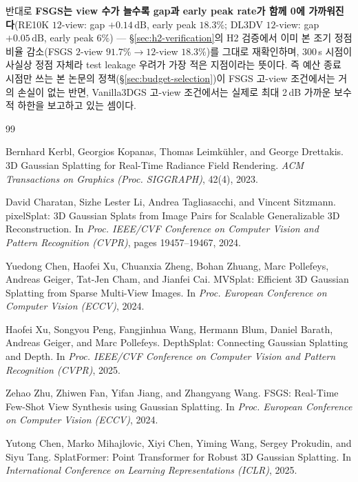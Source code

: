 반대로 \textbf{FSGS는 view 수가 늘수록 gap과 early peak rate가 함께 0에 가까워진다}(RE10K $12$-view: gap $+0.14\,\mathrm{dB}$, early peak $18.3\%$; DL3DV $12$-view: gap $+0.05\,\mathrm{dB}$, early peak $6\%$) — \S\ref{sec:h2-verification}의 H2 검증에서 이미 본 조기 정점 비율 감소(FSGS $2$-view $91.7\% \to 12$-view $18.3\%$)를 그대로 재확인하며, 300\,s 시점이 사실상 정점 자체라 test leakage 우려가 가장 적은 지점이라는 뜻이다. 즉 예산 종료 시점만 쓰는 본 논문의 정책(\S\ref{sec:budget-selection})이 FSGS 고-view 조건에서는 거의 손실이 없는 반면, Vanilla3DGS 고-view 조건에서는 실제로 최대 2\,dB 가까운 보수적 하한을 보고하고 있는 셈이다.


\begin{thebibliography}{99}

Bernhard Kerbl, Georgios Kopanas, Thomas Leimk\"uhler, and George Drettakis.
\newblock 3D Gaussian Splatting for Real-Time Radiance Field Rendering.
\newblock \emph{ACM Transactions on Graphics (Proc. SIGGRAPH)}, 42(4), 2023.

David Charatan, Sizhe Lester Li, Andrea Tagliasacchi, and Vincent Sitzmann.
\newblock pixelSplat: 3D Gaussian Splats from Image Pairs for Scalable Generalizable 3D Reconstruction.
\newblock In \emph{Proc. IEEE/CVF Conference on Computer Vision and Pattern Recognition (CVPR)}, pages 19457--19467, 2024.

Yuedong Chen, Haofei Xu, Chuanxia Zheng, Bohan Zhuang, Marc Pollefeys, Andreas Geiger, Tat-Jen Cham, and Jianfei Cai.
\newblock MVSplat: Efficient 3D Gaussian Splatting from Sparse Multi-View Images.
\newblock In \emph{Proc. European Conference on Computer Vision (ECCV)}, 2024.

Haofei Xu, Songyou Peng, Fangjinhua Wang, Hermann Blum, Daniel Barath, Andreas Geiger, and Marc Pollefeys.
\newblock DepthSplat: Connecting Gaussian Splatting and Depth.
\newblock In \emph{Proc. IEEE/CVF Conference on Computer Vision and Pattern Recognition (CVPR)}, 2025.

Zehao Zhu, Zhiwen Fan, Yifan Jiang, and Zhangyang Wang.
\newblock FSGS: Real-Time Few-Shot View Synthesis using Gaussian Splatting.
\newblock In \emph{Proc. European Conference on Computer Vision (ECCV)}, 2024.

Yutong Chen, Marko Mihajlovic, Xiyi Chen, Yiming Wang, Sergey Prokudin, and Siyu Tang.
\newblock SplatFormer: Point Transformer for Robust 3D Gaussian Splatting.
\newblock In \emph{International Conference on Learning Representations (ICLR)}, 2025.


\end{thebibliography}
